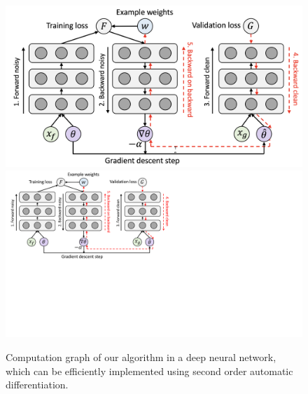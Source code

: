 \begin{figure}[t]
\centering
\iflatexml
\includegraphics[width=6\columnwidth]{figures/comp_graph.png}
\else
\includegraphics[width=\columnwidth,trim={0cm 8.9cm 15cm 0},clip]{figures/comp_graph.pdf}
\fi
\vspace{-0.1in}
\caption{Computation graph of our algorithm in a deep neural network, which can be efficiently implemented using second order automatic differentiation.}
\label{fig:comp_graph}
\end{figure}
